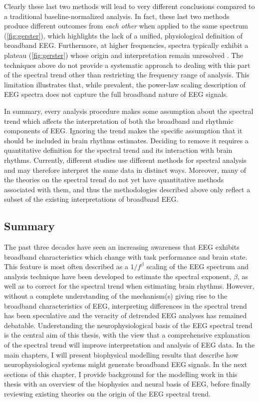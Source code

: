Clearly these last two methods will lead to very different conclusions compared to a traditional baseline-normalized analysis. In fact, these last two methods produce different outcomes from \textit{each other} when applied to the same spectrum (\autoref{fig:gerster}), which highlights the lack of a unified, physiological definition of broadband EEG. Furthermore, at higher frequencies, spectra typically exhibit a plateau  (\autoref{fig:gerster}) whose origin and interpretation remain unresolved \cite{Gerster2022}. The techniques above do not provide a systematic approach to dealing with this part of the spectral trend other than restricting the frequency range of analysis. This limitation illustrates that, while prevalent, the power-law scaling description of EEG spectra does not capture the full broadband nature of EEG signals. 

In summary, every analysis procedure makes some assumption about the spectral trend which affects the interpretation of both the broadband and rhythmic components of EEG. Ignoring the trend makes the specific assumption that it should be included in brain rhythms estimates. Deciding to remove it requires a quantitative definition for the spectral trend and its interaction with brain rhythms. Currently, different studies use different methods for spectral analysis and may therefore interpret the same data in distinct ways. Moreover, many of the theories on the spectral trend do not yet have quantitative methods associated with them, and thus the methodologies described above only reflect a subset of the existing interpretations of broadband EEG.

\subsection{Summary}
The past three decades have seen an increasing awareness that EEG exhibits broadband characteristics which change with task performance and brain state. This feature is most often described as a $1/f^\beta$ scaling of the EEG spectrum and analysis technique have been developed to estimate the spectral exponent, $\beta$, as well as to correct for the spectral trend when estimating brain rhythms. However, without a complete understanding of the mechanism(s) giving rise to the broadband characteristics of EEG, interpreting differences in the spectral trend has been speculative and the veracity of detrended EEG analyses has remained debatable. Understanding the neurophysiological basis of the EEG spectral trend is the central aim of this thesis, with the view that a comprehensive explanation of the spectral trend will improve interpretation and analysis of EEG data. In the main chapters, I will present biophysical modelling results that describe how neurophysiological systems might generate broadband EEG signals. In the next sections of this chapter, I provide background for the modelling work in this thesis with an overview of the biophysics and neural basis of EEG, before finally reviewing existing theories on the origin of the EEG spectral trend.

